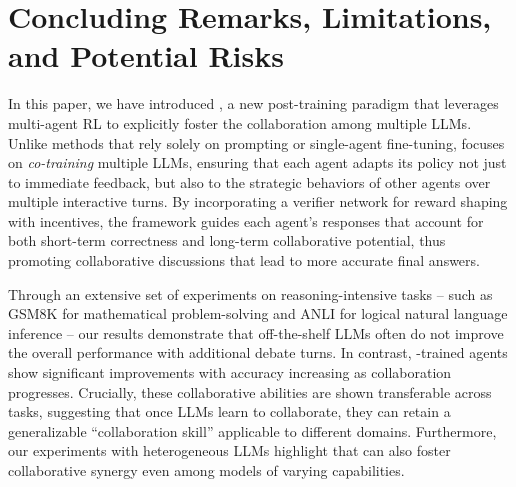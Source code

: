 \section{Concluding Remarks, Limitations, and Potential Risks}

In this paper, we have introduced \ours, a new post-training paradigm that leverages multi-agent RL to explicitly foster the collaboration among multiple LLMs. Unlike methods that rely solely on prompting or single-agent fine-tuning, \oursspace focuses on \textit{co-training} multiple LLMs, ensuring that each agent adapts its policy not just to immediate feedback, but also to the strategic behaviors of other agents over multiple interactive turns. By incorporating a verifier network for reward shaping with incentives, the framework guides each agent’s responses that account for both short-term correctness and long-term collaborative potential, thus promoting collaborative discussions that lead to more accurate final answers. 

Through an extensive set of experiments on reasoning-intensive tasks -- such as GSM8K for mathematical problem-solving and ANLI for logical natural language inference -- our results demonstrate that off-the-shelf LLMs often do not improve the overall performance with additional debate turns. In contrast, \ours-trained agents show significant improvements with accuracy increasing as collaboration progresses. Crucially, these collaborative abilities are shown transferable across tasks, suggesting that once LLMs learn to collaborate, they can retain a generalizable ``collaboration skill'' applicable to different domains.
Furthermore, our experiments with heterogeneous LLMs highlight that \oursspace can also foster collaborative synergy even among models of varying capabilities.







